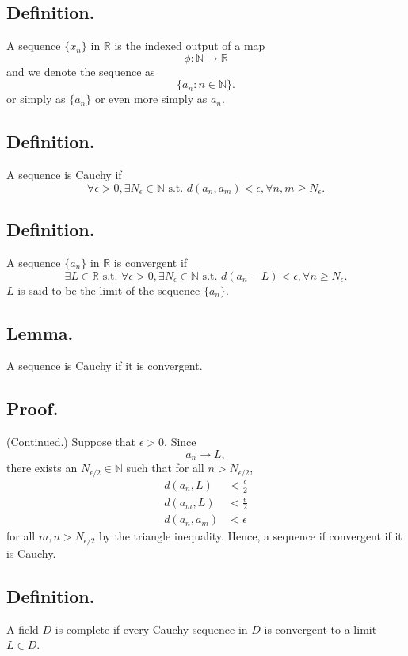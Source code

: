\documentclass[titlepage]{article}
\begin{document}
\subsection{Definition.} A sequence $\{x_{n}\}$ in $\mathbb{R}$ is the indexed output of a map 
$$\phi: \mathbb{N} \to \mathbb{R}$$
and we denote the sequence as 
$$\{a_{n}: n \in \mathbb{N}\}.$$
or simply as $\{a_{n}\}$ or even more simply as $a_{n}$.

\subsection{Definition.} A sequence is Cauchy if 
$$\forall \epsilon > 0, \exists N_{\epsilon} \in \mathbb{N} \text{ s.t. } d(a_{n}, a_{m}) < \epsilon, \forall n,m \geq N_{\epsilon}.$$

\subsection{Definition.} A sequence $\{a_{n}\}$ in $\mathbb{R}$ is convergent if 
$$\exists L \in \mathbb{R} \text{ s.t. } \forall \epsilon > 0, \exists N_{\epsilon} \in \mathbb{N} \text{ s.t. } d(a_{n} - L) < \epsilon, \forall n \geq N_{\epsilon}.$$
$L$ is said to be the limit of the sequence $\{a_{n}\}$.

\subsection{Lemma.} A sequence is Cauchy if it is convergent.

\subsection{Proof.} (Continued.) Suppose that $\epsilon > 0$. Since 
$$a_{n} \rightarrow L,$$
there exists an $N_{\epsilon/2} \in \mathbb{N}$ such that for all $n > N_{\epsilon/2}$,
\begin{align*}
        d(a_{n}, L) &< \frac{\epsilon}{2} \\
        d(a_{m}, L) &< \frac{\epsilon}{2} \\
    d(a_{n}, a_{m}) &< \epsilon
\end{align*}
for all $m, n > N_{\epsilon/2}$ by the triangle inequality. Hence, a sequence if convergent if it is Cauchy.

\subsection{Definition.} A field $D$ is complete if every Cauchy sequence in $D$ is convergent to a limit $L \in D$.
\end{document}
